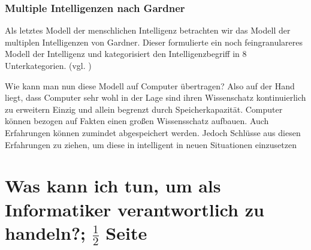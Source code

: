 \documentclass[a4paper, 11pt]{scrartcl}
\begin{document}
\subsubsection{Multiple Intelligenzen nach Gardner}
Als letztes Modell der menschlichen Intelligenz betrachten wir das Modell der multiplen Intelligenzen von Gardner. Dieser formulierte
ein noch feingranulareres Modell der Intelligenz und kategorisiert den Intelligenzbegriff in 8 Unterkategorien.
(vgl. \cite{Gardner1993})




Wie kann man nun diese Modell auf Computer übertragen?
Also auf der Hand liegt, dass Computer sehr wohl in der Lage sind ihren Wissenschatz kontinuierlich zu erweitern
Einzig und allein begrenzt durch Speicherkapazität. Computer können bezogen auf Fakten einen großen
Wissensschatz aufbauen. Auch Erfahrungen können zumindet abgespeichert werden. Jedoch Schlüsse aus diesen
Erfahrungen zu ziehen, um diese in intelligent in neuen Situationen einzusetzen

\newpage



\section{Was kann ich tun, um als Informatiker verantwortlich zu handeln?; $\frac{1}{2}$ Seite}

\newpage

\printbibliography














% 

% 
\end{document}
